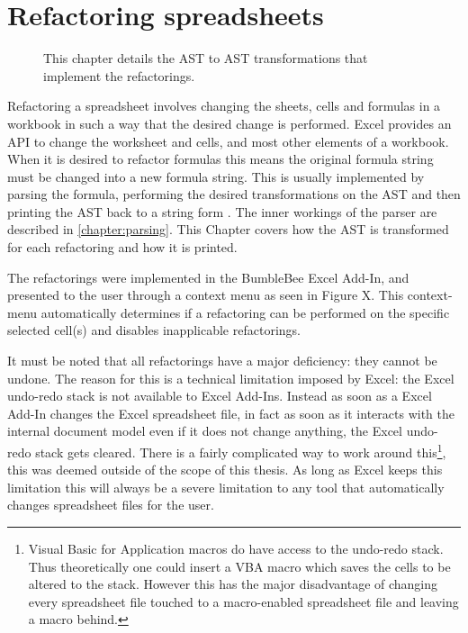 \chapter{Refactoring spreadsheets}
\label{chapter:implementingrefactorings}

\noindent
\begin{figure}[h!]
\hspace*{0.003\textwidth}

\caption{This chapter details the AST to AST transformations that implement the refactorings.}
\end{figure}

Refactoring a spreadsheet involves changing the sheets, cells and formulas in a workbook in such a way that the desired change is performed.
Excel provides an API to change the worksheet and cells, and most other elements of a workbook.
When it is desired to refactor formulas this means the original formula string must be changed into a new formula string.
This is usually implemented by parsing the formula, performing the desired transformations on the AST and then printing the AST back to a string form \cite{fowler1999refactoring}.
The inner workings of the parser are described in \ref{chapter:parsing}.
This Chapter covers how the AST is transformed for each refactoring and how it is printed.

The refactorings were implemented in the BumbleBee Excel Add-In, and presented to the user through a context menu as seen in Figure X.
This context-menu automatically determines if a refactoring can be performed on the specific selected cell(s) and disables inapplicable refactorings.

It must be noted that all refactorings have a major deficiency: they cannot be undone.
The reason for this is a technical limitation imposed by Excel: the Excel undo-redo stack is not available to Excel Add-Ins.
Instead as soon as a Excel Add-In changes the Excel spreadsheet file, in fact as soon as it interacts with the internal document model even if it does not change anything, the Excel undo-redo stack gets cleared.
There is a fairly complicated way to work around this\footnote{Visual Basic for Application macros do have access to the undo-redo stack. Thus theoretically one could insert a VBA macro which saves the cells to be altered to the stack. However this has the major disadvantage of changing every spreadsheet file touched to a macro-enabled spreadsheet file and leaving a macro behind.}, this was deemed outside of the scope of this thesis.
As long as Excel keeps this limitation this will always be a severe limitation to any tool that automatically changes spreadsheet files for the user.

